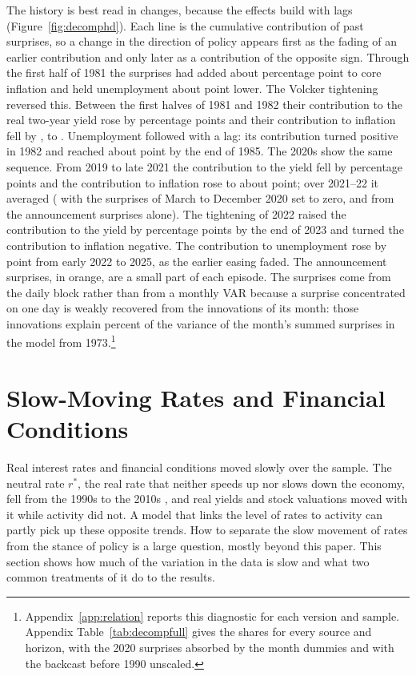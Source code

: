 \documentclass[11pt]{article}
\newcommand{\rs}{r^{*}}
\begin{document}
The history is best read in changes, because the effects build with lags (Figure~\ref{fig:decomphd}). Each line is the cumulative contribution of past surprises, so a change in the direction of policy appears first as the fading of an earlier contribution and only later as a contribution of the opposite sign. Through the first half of 1981 the surprises had added about  percentage point to core inflation and held unemployment about  point lower. The Volcker tightening reversed this. Between the first halves of 1981 and 1982 their contribution to the real two-year yield rose by  percentage points and their contribution to inflation fell by , to . Unemployment followed with a lag: its contribution turned positive in 1982 and reached about  point by the end of 1985. The 2020s show the same sequence. From 2019 to late 2021 the contribution to the yield fell by  percentage points and the contribution to inflation rose to about  point; over 2021--22 it averaged  ( with the surprises of March to December 2020 set to zero, and  from the announcement surprises alone). The tightening of 2022 raised the contribution to the yield by  percentage points by the end of 2023 and turned the contribution to inflation negative. The contribution to unemployment rose by  point from early 2022 to 2025, as the earlier easing faded. The announcement surprises, in orange, are a small part of each episode. The surprises come from the daily block rather than from a monthly VAR because a surprise concentrated on one day is weakly recovered from the innovations of its month: those innovations explain  percent of the variance of the month's summed surprises in the model from 1973.\footnote{Appendix~\ref{app:relation} reports this diagnostic for each version and sample. Appendix Table~\ref{tab:decompfull} gives the shares for every source and horizon, with the 2020 surprises absorbed by the month dummies and with the backcast before 1990 unscaled.}

\FloatBarrier
\section{Slow-Moving Rates and Financial Conditions}\label{sec:slow}
Real interest rates and financial conditions moved slowly over the sample. The neutral rate $\rs$, the real rate that neither speeds up nor slows down the economy, fell from the 1990s to the 2010s \citep{laubach2003,holston2017,holston2023,hamilton2016,bauer2020,kiley2020}, and real yields and stock valuations moved with it while activity did not. A model that links the level of rates to activity can partly pick up these opposite trends. How to separate the slow movement of rates from the stance of policy is a large question, mostly beyond this paper. This section shows how much of the variation in the data is slow and what two common treatments of it do to the results.
\end{document}
